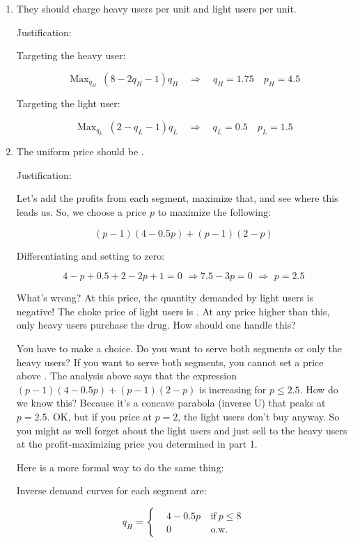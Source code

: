 \documentclass{article}
\DeclareMathOperator*{\Max}{Max}
\newenvironment{solution}{\color{red}}{\color{black}}
\begin{document}
\begin{solution}

\begin{enumerate}
\item They should charge heavy users  per unit and light users  per unit.

Justification:

Targeting the heavy user:

\[ \Max_{q_H} \ (8-2q_H-1)q_H \quad \Rightarrow \quad q_H=1.75 \quad p_H=4.5 \]

Targeting the light user:

\[ \Max_{q_L} \ (2-q_L-1)q_L \quad \Rightarrow \quad q_L=0.5 \quad p_L=1.5 \]

\item  The uniform price should be . 

Justification:

Let's add the profits from each segment, maximize that, and see where this leads us. So, we choose a price $p$ to maximize the following:

\[ (p-1)(4 - 0.5p) + (p-1)(2-p) \]

Differentiating and setting to zero:

 \[4 - p + 0.5 + 2 - 2p + 1 = 0\,\, \Rightarrow 7.5 - 3p = 0\,\, \Rightarrow \,\, p = 2.5 \]

What's wrong? At this price, the quantity demanded by light users is negative! The choke price of light users is . At any price higher than this, only heavy users purchase the drug. How should one handle this?

You have to make a choice. Do you want to serve both segments or only the heavy users? If you want to serve both segments, you cannot set a price above . The analysis above says that the expression $(p-1)(4 - 0.5p) + (p-1)(2-p)$ is increasing for $p \leq 2.5$. How do we know this? Because it's a concave parabola (inverse U) that peaks at $p=2.5$. OK, but if you price at $p = 2$, the light users don't buy anyway. So you might as well forget about the light users and just sell to the heavy users at the profit-maximizing price you determined in part 1.

Here is a more formal way to do the same thing:

Inverse demand curves for each segment are:

\[ q_H=\left\{\begin{aligned}
& 4-0.5p\  & \text{if}\ p\leq 8\\
& 0\ & \text{o.w.}
\end{aligned}\right. \]


\end{enumerate}
\end{solution}
\end{document}
